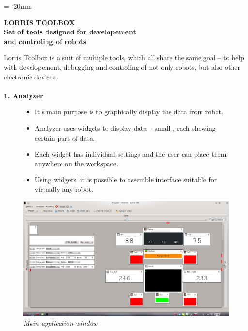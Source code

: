 \documentclass[17pt]{extreport}
\newcommand{\B}{\textbf} %
\newcommand{\It}{\textit}  %
\begin{document}

\pagestyle{empty} %

\voffset = -20mm %
\enlargethispage{100mm} %

\begin{center}
    \Large \B{LORRIS TOOLBOX \\ Set of tools designed for developement\\and controling of robots}
\end{center}
\vspace{5mm}
\setlength{\footskip}{0pt}
\setlength{\textheight}{750pt}
Lorris Toolbox is a suit of multiple tools, which all share the same goal -- to help with developement, debugging and controling of not only robots, but also other electronic devices. \\ \\
{\large \B{ 1. Analyzer }}
\begin{figure}[ht]
    \begin{minipage}[t]{0.48\linewidth}
    \begin{itemize} 
        \item It's main purpose is to graphically display the data from robot.
        \item Analyzer uses widgets to display data -- small , each showing certain part of data.
        \item Each widget has individual settings and the user can place them anywhere on the workspace.
        \item Using widgets, it is possible to assemble interface suitable for virtually any robot.
        
    \end{itemize}
    \end{minipage}
    \hfill
    \begin{minipage}[t]{0.50\linewidth}
        \vspace{0pt}
        \includegraphics[width=\linewidth]{img/screen.png}
        \centering \It{Main application window}
    \end{minipage}
\end{figure}
\end{document}
